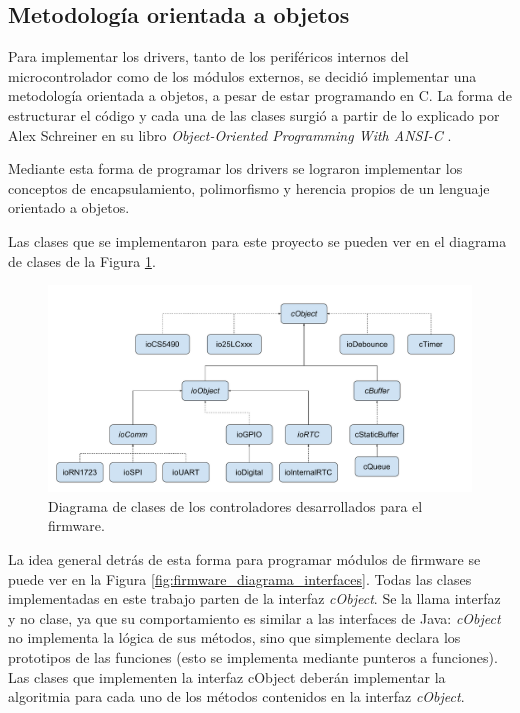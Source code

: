 \subsection{Metodología orientada a objetos}
\label{subsec:orientado_a_objetos}

Para implementar los drivers, tanto de los periféricos internos del microcontrolador como de los módulos externos, se decidió implementar una metodología orientada a objetos, a pesar de estar programando en C. La forma de estructurar el código y cada una de las clases surgió a partir de lo explicado por Alex Schreiner en su libro \textit{Object-Oriented Programming With ANSI-C } \citep{schreiner1993}.

Mediante esta forma de programar los drivers se lograron implementar los conceptos de encapsulamiento, polimorfismo y herencia propios de un lenguaje orientado a objetos.

Las clases que se implementaron para este proyecto se pueden ver en el diagrama de clases de la Figura \ref{fig:firmware_diagrama_clases}.

\begin{figure}[h]
	\centering
	\includegraphics[width=14cm]{./Figures/3_2_3_diagrama-clases-simplificado.pdf}
	\caption{Diagrama de clases de los controladores desarrollados para el firmware.}
	\label{fig:firmware_diagrama_clases}
\end{figure}

La idea general detrás de esta forma para programar módulos de firmware se puede ver en la Figura \ref{fig:firmware_diagrama_interfaces}. Todas las clases implementadas en este trabajo parten de la interfaz \textit{cObject}. Se la llama interfaz y no clase, ya que su comportamiento es similar a las interfaces de Java: \textit{cObject} no implementa la lógica de sus métodos, sino que simplemente declara los prototipos de las funciones (esto se implementa mediante punteros a funciones). Las clases que implementen la interfaz cObject deberán implementar la algoritmia para cada uno de los métodos contenidos en la interfaz \textit{cObject}.

